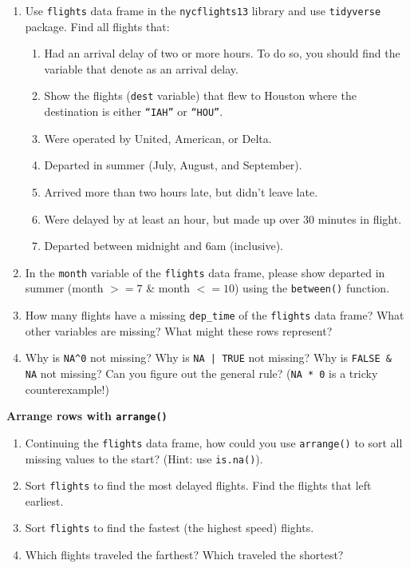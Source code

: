 \documentclass[11pt,a4paper]{article}
\begin{document}
\begin{enumerate}
	\item Use \texttt{flights} data frame in the \texttt{nycflights13} library and use \texttt{tidyverse} package. Find all flights that:
	
	\begin{enumerate}
		\item Had an arrival delay of two or more hours. To do so, you should find the variable that denote as an arrival delay.
		\item Show the flights (\texttt{dest} variable) that flew to Houston where the destination is either \texttt{``IAH''} or \texttt{``HOU''}.
		\item Were operated by United, American, or Delta.
		\item Departed in summer (July, August, and September).
		\item Arrived more than two hours late, but didn't leave late.
		\item Were delayed by at least an hour, but made up over 30 minutes in flight. 
		\item Departed between midnight and 6am (inclusive).
	\end{enumerate}
		
	\item In the \texttt{month} variable of the \texttt{flights} data frame, please show departed in summer (month $>= 7$ \& month $<= 10$) using the \texttt{between()} function.	
	
	\item How many flights have a missing \texttt{dep\_time} of the \texttt{flights} data frame? What other variables are missing? What might these rows represent?
	
	\item Why is \texttt{NA\textasciicircum 0} not missing? Why is \texttt{NA | TRUE} not missing? Why is \texttt{FALSE \& NA} not missing? Can you figure out the general rule? (\texttt{NA * 0} is a tricky counterexample!)

\end{enumerate}
\noindent \textbf{Arrange rows with \texttt{arrange()}}

\begin{enumerate}
	\item Continuing the \texttt{flights} data frame, how could you use \texttt{arrange()} to sort all missing values to the start? (Hint: use \texttt{is.na()}).
	
	\item Sort \texttt{flights} to find the most delayed flights. Find the flights that left earliest.
	
	\item Sort \texttt{flights} to find the fastest (the highest speed) flights.
	
	\item Which flights traveled the farthest? Which traveled the shortest?

\end{enumerate}
\end{document}

